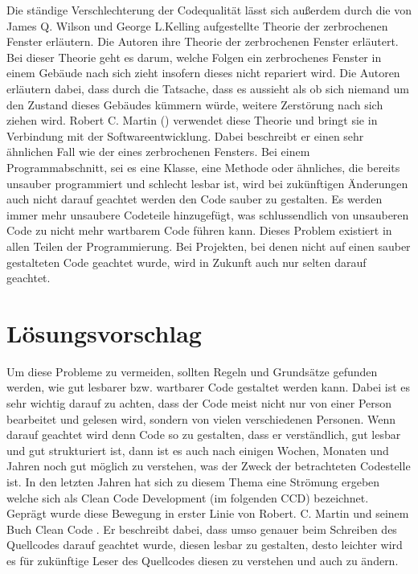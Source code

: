 \SuperPar Die ständige Verschlechterung der Codequalität lässt sich außerdem durch die von James Q. Wilson und George L.Kelling \cite{Wilson2016}  aufgestellte Theorie der zerbrochenen Fenster erläutern. Die Autoren ihre Theorie der zerbrochenen Fenster erläutert. Bei dieser Theorie geht es darum, welche Folgen ein zerbrochenes Fenster in einem Gebäude nach sich zieht insofern dieses nicht repariert wird. Die Autoren erläutern dabei, dass durch die Tatsache, dass es aussieht als ob sich niemand um den Zustand dieses Gebäudes kümmern würde, weitere Zerstörung nach sich ziehen wird. Robert C. Martin (\cite{Martin2008}) verwendet diese Theorie und bringt sie in Verbindung mit der Softwareentwicklung. Dabei beschreibt er einen sehr ähnlichen Fall wie der eines zerbrochenen Fensters. Bei einem Programmabschnitt, sei es eine Klasse, eine Methode oder ähnliches, die bereits unsauber programmiert und schlecht lesbar ist, wird bei zukünftigen Änderungen auch nicht darauf geachtet werden den Code sauber zu gestalten. Es werden immer mehr unsaubere Codeteile hinzugefügt, was schlussendlich von unsauberen Code zu nicht mehr wartbarem Code führen kann. Dieses Problem existiert in allen Teilen der Programmierung. Bei Projekten, bei denen nicht auf einen sauber gestalteten Code geachtet wurde, wird in Zukunft auch nur selten darauf geachtet. 

\section{Lösungsvorschlag}
Um diese Probleme zu vermeiden, sollten Regeln und Grundsätze gefunden werden, wie gut lesbarer bzw. wartbarer Code gestaltet werden kann. Dabei ist es sehr wichtig darauf zu achten, dass der Code meist nicht nur von einer Person bearbeitet und gelesen wird, sondern von vielen verschiedenen Personen. Wenn darauf geachtet wird denn Code so zu gestalten, dass er verständlich, gut lesbar und gut strukturiert ist, dann ist es auch nach einigen Wochen, Monaten und Jahren noch gut möglich zu verstehen, was der Zweck der betrachteten Codestelle ist. In den letzten Jahren hat sich zu diesem Thema eine Strömung ergeben welche sich als Clean Code Development (im folgenden CCD) bezeichnet. Geprägt wurde diese Bewegung in erster Linie von Robert. C. Martin und seinem Buch Clean Code \cite{Martin2008}. Er beschreibt dabei, dass umso genauer beim Schreiben des Quellcodes darauf geachtet wurde, diesen lesbar zu gestalten, desto leichter wird es für zukünftige Leser des Quellcodes diesen zu verstehen und auch zu ändern. 

